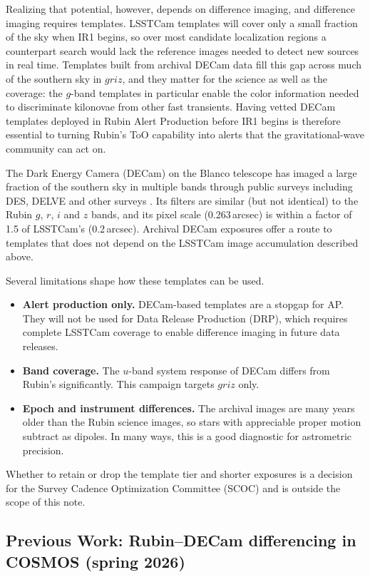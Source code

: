 Realizing that potential, however, depends on difference imaging, and difference imaging requires templates. LSSTCam templates will cover only a small fraction of the sky when IR1 begins, so over most candidate localization regions a counterpart search would lack the reference images needed to detect new sources in real time. Templates built from archival DECam data fill this gap across much of the southern sky in $griz$, and they matter for the science as well as the coverage: the $g$-band templates in particular enable the color information needed to discriminate kilonovae from other fast transients. Having vetted DECam templates deployed in Rubin Alert Production before IR1 begins is therefore essential to turning Rubin's ToO capability into alerts that the gravitational-wave community can act on.
 
The Dark Energy Camera (DECam) on the Blanco telescope has imaged a large fraction of the southern sky in multiple bands through public surveys including DES, DELVE and other surveys \citep{DES,DELVE}. Its filters are similar (but not identical) to the Rubin $g$, $r$, $i$ and $z$ bands, and its pixel scale (0.263\,arcsec) is within a factor of 1.5 of LSSTCam's (0.2\,arcsec). Archival DECam exposures offer a route to templates that does not depend on the LSSTCam image accumulation described above.
 
Several limitations shape how these templates can be used.
\begin{itemize}
  \item \textbf{Alert production only.} DECam-based templates are a stopgap for AP. They will not be used for Data Release Production (DRP), which requires complete LSSTCam coverage to enable difference imaging in future data releases.
  \item \textbf{Band coverage.} The $u$-band system response of DECam differs from Rubin's significantly. This campaign targets $griz$ only.
  \item \textbf{Epoch and instrument differences.} The archival images are many years older than the Rubin science images, so stars with appreciable proper motion subtract as dipoles. In many ways, this is a good diagnostic for astrometric precision.
\end{itemize}

Whether to retain or drop the template tier and shorter exposures is a decision for the Survey Cadence Optimization Committee (SCOC) and is outside the scope of this note.

\subsection{Previous Work: Rubin--DECam differencing in COSMOS (spring 2026)}
 
